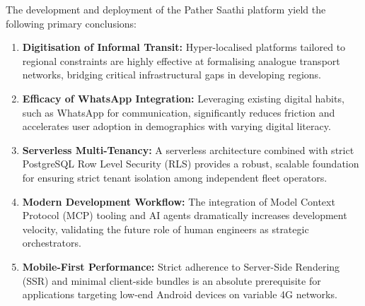 \documentclass[12pt, a4paper, oneside]{report}
\begin{document}
The development and deployment of the Pather Saathi platform yield the following primary conclusions:
\begin{enumerate}[leftmargin=*]
    \item \textbf{Digitisation of Informal Transit:} Hyper-localised platforms tailored to regional constraints are highly effective at formalising analogue transport networks, bridging critical infrastructural gaps in developing regions.
    \item \textbf{Efficacy of WhatsApp Integration:} Leveraging existing digital habits, such as WhatsApp for communication, significantly reduces friction and accelerates user adoption in demographics with varying digital literacy.
    \item \textbf{Serverless Multi-Tenancy:} A serverless architecture combined with strict PostgreSQL Row Level Security (RLS) provides a robust, scalable foundation for ensuring strict tenant isolation among independent fleet operators.
    \item \textbf{Modern Development Workflow:} The integration of Model Context Protocol (MCP) tooling and AI agents dramatically increases development velocity, validating the future role of human engineers as strategic orchestrators.
    \item \textbf{Mobile-First Performance:} Strict adherence to Server-Side Rendering (SSR) and minimal client-side bundles is an absolute prerequisite for applications targeting low-end Android devices on variable 4G networks.
\end{enumerate}

\clearpage
\renewcommand{\bibname}{References}
\nocite{*}


\end{document}
